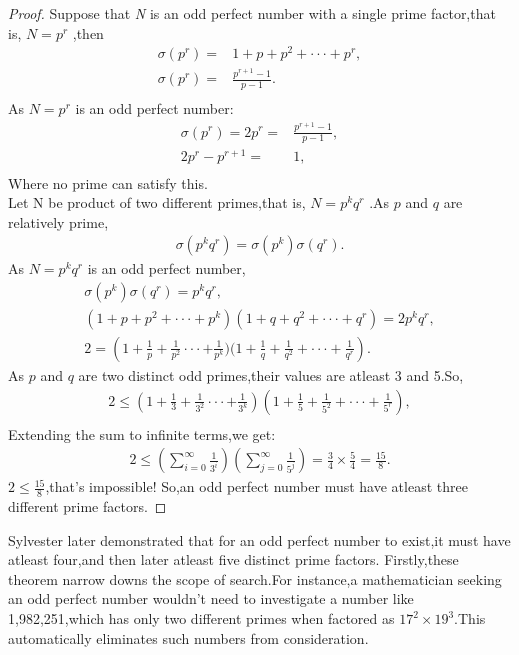 \documentclass[a4paper,reqno,11pt]{book}
\theoremstyle{plain}%
\theoremstyle{definition}
\begin{document}
\begin{proof}
Suppose that \textit{N} is an odd perfect number with a single prime factor,that is, $N=p^r$ ,then
\begin{align*}
    \sigma(p^r)=&1+p+p^2+\cdot\cdot\cdot+p^r,\\
    \sigma(p^r)=&\frac{p^{r+1}-1}{p-1}.\\
\end{align*}
As $N=p^r$ is an odd perfect number:\\
\begin{align*}
    \sigma(p^r)=2p^r=&\frac{p^{r+1}-1}{p-1},\\
    2p^r-p^{r+1}=&1,\\
\end{align*}
Where no prime can satisfy this.\\
Let N be product of two different primes,that is, $N=p^kq^r$ .As $p$ and $q$ are relatively prime,
\begin{eqnarray*}
    \sigma(p^kq^r)=\sigma(p^k)\sigma(q^r).
\end{eqnarray*}
As $N=p^kq^r$ is an odd perfect number,
\begin{eqnarray*}
    \sigma(p^k)\sigma(q^r)=p^kq^r,\\
    (1+p+p^2+\cdot\cdot\cdot+p^k)(1+q+q^2+\cdot\cdot\cdot+q^r)=2p^kq^r,\\
    2=\left(1+\frac{1}{p}+\frac{1}{p^2}\cdot\cdot\cdot+\frac{1}{p^k})(1+\frac{1}{q}+\frac{1}{q^2}+\cdot\cdot\cdot+\frac{1}{q^r}\right).
\end{eqnarray*}
As $p$ and $q$ are two distinct odd primes,their values are atleast 3 and 5.So,\\
\begin{eqnarray*}
    2\leq\left(1+\frac{1}{3}+\frac{1}{3^2}\cdot\cdot\cdot+\frac{1}{3^k}\right)\left(1+\frac{1}{5}+\frac{1}{5^2}+\cdot\cdot\cdot+\frac{1}{5^r}\right),\\
\end{eqnarray*}
Extending the sum to infinite terms,we get:
\begin{eqnarray*}
    2\leq\left(\sum_{i=0}^{\infty}\frac{1}{3^i}\right)\left(\sum_{j=0}^{\infty}\frac{1}{5^j}\right)=\frac{3}{4}\times\frac{5}{4}=\frac{15}{8}.
\end{eqnarray*}
$2\leq\frac{15}{8}$,that's impossible! So,an odd perfect number must have atleast three different prime factors.
\end{proof}
Sylvester later demonstrated that for an odd perfect number to exist,it must have atleast four,and then later atleast five distinct prime factors. Firstly,these theorem narrow downs the scope of search.For instance,a mathematician seeking an odd perfect number wouldn't need to investigate a number like 1,982,251,which has only two different primes when factored as $17^2\times19^3$.This automatically eliminates such numbers from consideration.\\
\end{document}
